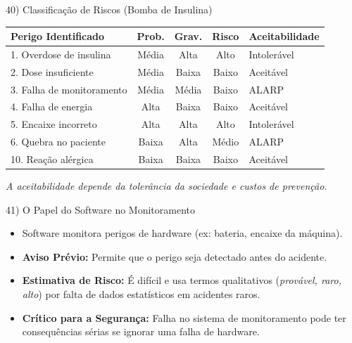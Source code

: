 \documentclass[aspectratio=169]{beamer}
\begin{document}
\begin{frame}{40) Classificação de Riscos (Bomba de Insulina)}
  \centering
  \scriptsize
  \begin{tabular}{|l|c|c|c|l|}
    \hline
    \textbf{Perigo Identificado} & \textbf{Prob.} & \textbf{Grav.} & \textbf{Risco} & \textbf{Aceitabilidade} \\ \hline
    1. Overdose de insulina & Média & Alta & Alto & \alert{Intolerável} \\ \hline
    2. Dose insuficiente & Média & Baixa & Baixo & Aceitável \\ \hline
    3. Falha de monitoramento & Média & Média & Baixo & ALARP \\ \hline
    4. Falha de energia & Alta & Baixa & Baixo & Aceitável \\ \hline
    5. Encaixe incorreto & Alta & Alta & Alto & \alert{Intolerável} \\ \hline
    6. Quebra no paciente & Baixa & Alta & Médio & ALARP \\ \hline
    10. Reação alérgica & Baixa & Baixa & Baixo & Aceitável \\ \hline
  \end{tabular}
  \vspace{0.4em}
  \textit{A aceitabilidade depende da tolerância da sociedade e custos de prevenção.}
\end{frame}

\begin{frame}{41) O Papel do Software no Monitoramento}
  \begin{itemize}
    \item Software monitora perigos de hardware (ex: bateria, encaixe da máquina).
    \item \textbf{Aviso Prévio:} Permite que o perigo seja detectado antes do acidente.
    \item \textbf{Estimativa de Risco:} É difícil e usa termos qualitativos (\textit{provável, raro, alto}) por falta de dados estatísticos em acidentes raros.
    \item \textbf{Crítico para a Segurança:} Falha no sistema de monitoramento pode ter consequências sérias se ignorar uma falha de hardware.
  \end{itemize}
\end{frame}
\end{document}
